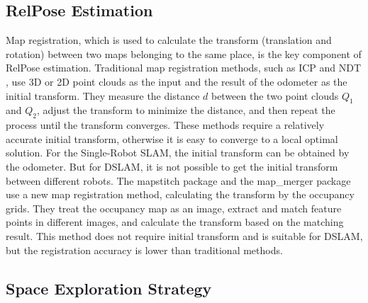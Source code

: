 \subsection{RelPose Estimation}
Map registration, which is used to calculate the transform (translation and rotation) between two maps belonging to the same place, is the key component of RelPose estimation.
Traditional map registration methods, such as ICP \cite{icp} and NDT \cite{ndt}, use 3D or 2D point clouds as the input and the result of the odometer as the initial transform.
They measure the distance $d$ between the two point clouds $Q_1$ and $Q_2$, adjust the transform to minimize the distance, and then repeat the process until the transform converges.
These methods require a relatively accurate initial transform, otherwise it is easy to converge to a local optimal solution.
For the Single-Robot SLAM, the initial transform can be obtained by the odometer.
But for DSLAM, it is not possible to get the initial transform between different robots.
The mapstitch package \cite{mapstitch} and the map\_merger package \cite{map-merger} use a new map registration method, calculating the transform by the occupancy grids.
They treat the occupancy map as an image, extract and match feature points in different images, and calculate the transform based on the matching result.
This method does not require initial transform and is suitable for DSLAM, but the registration accuracy is lower than traditional methods.

\subsection{Space Exploration Strategy}
